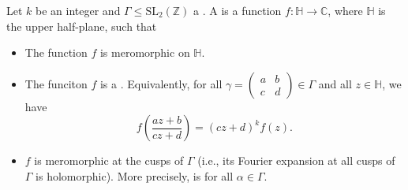 \begin{definition} \label{definition:automorphic_form_of_weight_k_with_respect_to_a_congruence_subgroup_of_SL_2_Z}
Let $k$ be an integer and $\Gamma \leq \mathrm{SL}_2(\mathbb{Z})$ a . A  is a function $f : \mathbb{H} \to \mathbb{C}$, where $\mathbb{H}$ is the upper half-plane, such that 
\begin{itemize}
    \item The function $f$ is meromorphic on $\mathbb{H}$.
    \item The funciton $f$ is a . Equivalently, for all $\gamma = \begin{pmatrix} a & b \\ c & d \end{pmatrix}\in \Gamma$ and all $z \in \mathbb{H}$, we have
    $$ f\left( \frac{a z + b}{c z + d} \right) = (c z + d)^k f(z).  $$
    \item $f$ is meromorphic at the cusps of $\Gamma$ (i.e., its Fourier expansion at all cusps of $\Gamma$ is holomorphic). More precisely,  is  for all $\alpha \in \Gamma$.
\end{itemize}
\end{definition}